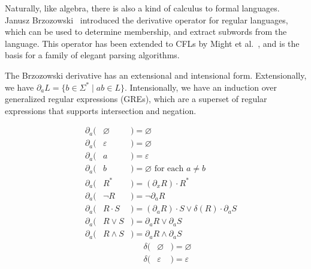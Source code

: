 Naturally, like algebra, there is also a kind of calculus to formal languages. Janusz Brzozowski~\cite{brzozowski1964derivatives} introduced the derivative operator for regular languages, which can be used to determine membership, and extract subwords from the language. This operator has been extended to CFLs by Might et al.~\cite{might2011parsing}, and is the basis for a family of elegant parsing algorithms.

The Brzozowski derivative has an extensional and intensional form. Extensionally, we have $\partial_a L = \{b \in \Sigma^* \mid ab \in L\}$. Intensionally, we have an induction over generalized regular expressions (GREs), which are a superset of regular expressions that supports intersection and negation.\vspace{-1cm}

\begin{multicols}{2}
  \begin{eqnarray*}
    \phantom{-}\partial_a( & \varnothing & )= \varnothing                                           \\
    \phantom{-}\partial_a( & \varepsilon & )= \varnothing                                           \\
    \phantom{-}\partial_a( & a           & )= \varepsilon                                           \\
    \phantom{-}\partial_a( & b           & )= \varnothing  \text{ for each } a \neq b               \\
    \phantom{-}\partial_a( & R^*         & )= (\partial_x R)\cdot R^*                               \\
    \phantom{-}\partial_a( & \neg R      & )= \neg \partial_a R                                     \\
    \phantom{-}\partial_a( & R\cdot S    & )= (\partial_a R)\cdot S \vee \delta(R)\cdot\partial_a S \\
    \phantom{-}\partial_a( & R\vee S     & )= \partial_a R \vee \partial_a S                        \\
    \phantom{-}\partial_a( & R\land S    & )= \partial_a R \land \partial_a S
  \end{eqnarray*} \break\vspace{-0.5cm}
  \begin{eqnarray*}
    \phantom{---}\delta(& \varnothing &)= \varnothing                                      \\
    \phantom{---}\delta(& \varepsilon &)= \varepsilon                                      \\

\end{eqnarray*}
\end{multicols}
